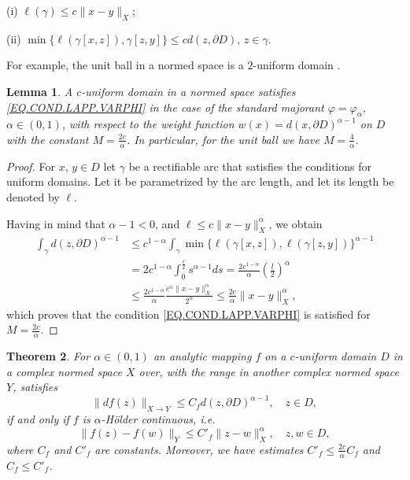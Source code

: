 \documentclass{amsart}
\newtheorem{theorem}{Theorem}[section]
\newtheorem{lemma}[theorem]{Lemma}
\theoremstyle{definition}
\numberwithin{equation}{section}
\begin{document}
(i) $\ell(\gamma) \le c \|x-y\|_X$;

(ii) $\min\{\ell(\gamma[x,z]), \gamma[z,y]\} \le c d(z,\partial D)$, $z\in \gamma$.

For example, the unit ball in a normed space is a $2$-uniform domain \cite{VAISALA.CGD}.


\begin{lemma}\label{LE.UNIFORM.ALPHA}
A $c$-uniform domain in a normed space satisfies \eqref{EQ.COND.LAPP.VARPHI} in the case of the standard majorant
$\varphi = \varphi_\alpha$, $\alpha\in (0,1)$, with respect to the weight function $w(x) = d(x,\partial D)^{\alpha-1}$
on $D$ with the constant $M = \frac {2c}\alpha$. In particular, for the unit ball we have $M = \frac {4}\alpha$.
\end{lemma}

\begin{proof}
For $x$, $y\in D$ let $\gamma$ be a rectifiable arc that satisfies the conditions for uniform domains. Let it be
parametrized by the arc length, and let its length be denoted by $\ell$.

Having in mind that $\alpha -1<0$, and  $\ell \le c \|x-y\|^\alpha_X$, we obtain
\begin{equation*}\begin{split}
\int_\gamma d(z,\partial D)^{\alpha-1} &
\le c^{1-\alpha} \int_\gamma\min\{\ell(\gamma[x,z]),\ell( \gamma[z,y])\}^{\alpha-1}
\\&=2c^{1-\alpha}\int_0^{\frac \ell2}s^{\alpha -1}ds = \frac {2c^{1-\alpha}}\alpha\left(\frac l2\right)^\alpha
\\&\le \frac {2 c^{1-\alpha}}\alpha \frac {c^\alpha\|x-y\|^\alpha_X} {2^\alpha} \le  \frac {2c}{\alpha} \|x-y\|^\alpha_X,
\end{split}\end{equation*}
which proves that the condition  \eqref{EQ.COND.LAPP.VARPHI}  is satisfied for $M = \frac {2c}\alpha$.
\end{proof}

\begin{theorem}
For $\alpha\in (0,1)$ an analytic mapping $f$ on a $c$-uniform domain $D$ in a complex normed space $X$ over, with
the range in another complex normed space $Y$, satisfies
\begin{equation*}
\|df (z)\|_{X\to Y} \le C_f d(z,\partial D)^{\alpha-1}, \quad z\in D,
\end{equation*}
if and only if $f$ is $\alpha$-H\"{o}lder continuous, i.e.
\begin{equation*}
\|f(z) - f(w)\|_Y\le C'_f\|z-w\|_X^{\alpha},\quad  z,w\in D,
\end{equation*}
where $C_f$ and $C'_f$ are constants. Moreover, we have estimates $C'_f\le \frac{2c}\alpha C_f$ and $C_f\le C'_f$.
\end{theorem}
\end{document}
